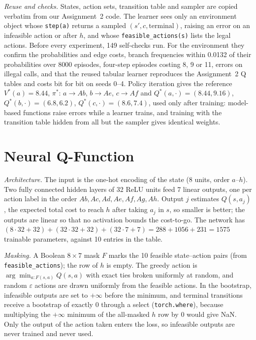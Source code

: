 \documentclass[conference]{IEEEtran}
\newcommand{\code}[1]{\texttt{#1}}
\begin{document}
\emph{Reuse and checks.} States, action sets, transition table and sampler are copied
verbatim from our Assignment~2 code. The learner sees only an environment object whose
\code{step(a)} returns a sampled $(s',c,\text{terminal})$, raising an error on an infeasible
action or after $h$, and whose \code{feasible\_actions(s)} lists the legal actions. Before
every experiment, 149 self-checks run. For the environment they confirm the probabilities and
edge costs, branch frequencies within 0.0132 of their probabilities over 8000 episodes,
four-step episodes costing 8, 9 or 11, errors on illegal calls, and that the reused tabular
learner reproduces the Assignment~2 Q tables and costs bit for bit on seeds 0--4. Policy
iteration \cite{si6} gives the reference $V^*(a)=8.44$, $\pi^*$: $a\to\mathit{Ab}$,
$b\to\mathit{Ae}$, $c\to\mathit{Af}$ and $Q^*(a,\cdot)=(8.44,9.16)$, $Q^*(b,\cdot)=(6.8,6.2)$,
$Q^*(c,\cdot)=(8.6,7.4)$, used only after training: model-based functions raise errors while a
learner trains, and training with the transition table hidden from all but the sampler gives
identical weights.

\section{Neural Q-Function}
\emph{Architecture.} The input is the one-hot encoding of the state (8 units, order
$a$--$h$). Two fully connected hidden layers of 32 ReLU units feed 7 linear outputs, one per
action label in the order $\mathit{Ab}, \mathit{Ac}, \mathit{Ad}, \mathit{Ae}, \mathit{Af},
\mathit{Ag}, \mathit{Ah}$. Output $j$ estimates $Q(s,a_j)$, the expected total cost to reach
$h$ after taking $a_j$ in $s$, so smaller is better; the outputs are linear so that no
activation bounds the cost-to-go. The network has
$(8\cdot32+32)+(32\cdot32+32)+(32\cdot7+7)=288+1056+231=1575$ trainable parameters, against
10 entries in the table.

\emph{Masking.} A Boolean $8\times7$ mask $F$ marks the 10 feasible state--action pairs (from
\code{feasible\_actions}); the row of $h$ is empty. The greedy action is
$\arg\min_{a:F(s,a)}Q(s,a)$ with exact ties broken uniformly at random, and random
$\varepsilon$ actions are drawn uniformly from the feasible actions. In the bootstrap,
infeasible outputs are set to $+\infty$ before the minimum, and terminal transitions receive a
bootstrap of exactly 0 through a select (\code{torch.where}), because multiplying the
$+\infty$ minimum of the all-masked $h$ row by 0 would give NaN. Only the output of the action
taken enters the loss, so infeasible outputs are never trained and never used.
\end{document}
